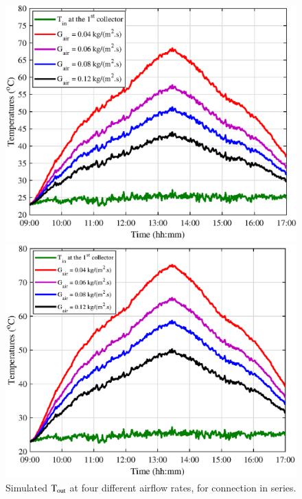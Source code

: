 \begin{figure}[ht!]
	\begin{minipage}{0.49\columnwidth}
		\includegraphics[scale=0.49]{figs/series_2nd.eps}
		
	\end{minipage}
	\begin{minipage}{0.49\columnwidth}
		\includegraphics[scale=0.49]{figs/series_3rd.eps}
		
	\end{minipage}
	\caption{Simulated $\rm{T_{out}}$ at four different airflow rates, for connection in series.}
	\label{Temp-series}
\end{figure}

